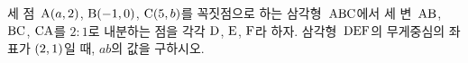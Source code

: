 세 점~$\mathrm{A}(a{,}\mkern3mu\mathopen{}2)$, $\mathrm{B}(-1{,}\mkern3mu\mathopen{}0)$, $\mathrm{C}(5{,}\mkern3mu\mathopen{}b)$를 꼭짓점으로 하는 삼각형~$\mathrm{ABC}$에서 세 변~$\mathrm{AB}$, $\mathrm{BC}$, $\mathrm{CA}$를 $2:1$로 내분하는 점을 각각 $\mathrm{D}$, $\mathrm{E}$, $\mathrm{F}$라 하자. 삼각형~$\mathrm{DEF}$의 무게중심의 좌표가 $(2{,}\mkern3mu\mathopen{}1)$일 때, $ab$의 값을 구하시오.
